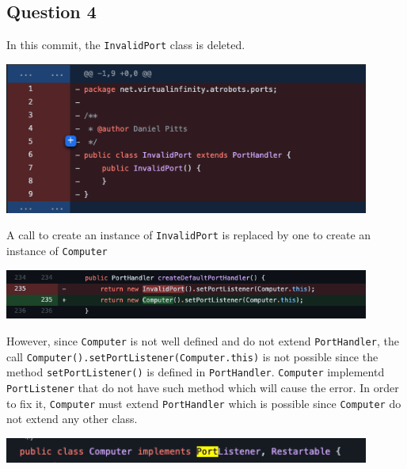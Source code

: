 \newpage
\subsection*{Question 4}
\noindent In this commit, the \verb|InvalidPort| class is deleted. 
\begin{center}
    \includegraphics[width=0.9\textwidth]{img/partF_1.png}
\end{center}

\noindent A call to create an instance of \verb|InvalidPort| is replaced by one to create an instance of \verb|Computer|
\begin{center}
    \includegraphics[width=0.9\textwidth]{img/partF_2.png}
\end{center}

\noindent However, since \verb|Computer| is not well defined and do not extend \verb|PortHandler|, the call \verb|Computer().setPortListener(Computer.this)| is not possible since the method \verb|setPortListener()| is defined in \verb|PortHandler|. \verb|Computer| implementd \verb|PortListener| that do not have such method which will cause the error. In order to fix it, \verb|Computer| must extend \verb|PortHandler| which is possible since \verb|Computer| do not extend any other class. 

\begin{center}
    \includegraphics[width=0.9\textwidth]{img/partF_3.png}
\end{center}
